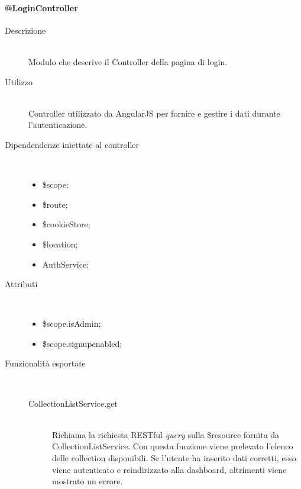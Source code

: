 \paragraph{@LoginController}
\begin{description}
 \item[Descrizione] \hfill \\
 Modulo che descrive il Controller della pagina di login.
 
 \item[Utilizzo] \hfill \\
 Controller utilizzato da AngularJS per fornire e gestire i dati durante l'autenticazione.
 
 \item[Dipendendenze iniettate al controller] \hfill \\
 \begin{itemize}
  \item \$scope;
  \item \$route;
  \item \$cookieStore;
  \item \$location;
  \item AuthService;
  
 \end{itemize}
 
 \item[Attributi] \hfill \\
 \begin{itemize}
 \item  \$scope.isAdmin;
 \item \$scope.signup\textunderscore enabled;
 \end{itemize}
 
 \item[Funzionalità esportate] \hfill \\
 \begin{description}
  \item[ CollectionListService.get] \hfill \\
  Richiama la richiesta RESTful \textit{query} sulla \$resource fornita da CollectionListService.
  Con questa funzione viene prelevato l'elenco delle collection disponibili.
  Se l'utente ha inserito dati corretti, esso viene autenticato e reindirizzato alla dashboard, altrimenti viene mostrato un errore.
 
  
 \end{description}
\end{description}

